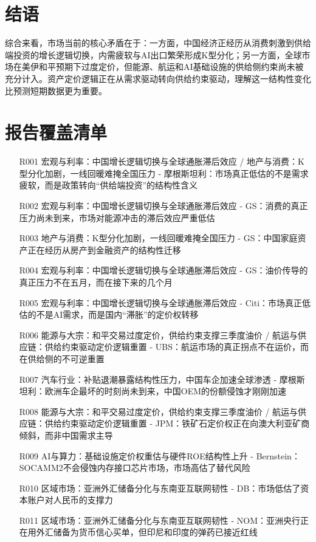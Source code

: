 \documentclass[11pt]{ctexart}
\begin{document}
\section{结语}
综合来看，市场当前的核心矛盾在于：一方面，中国经济正经历从消费刺激到供给端投资的增长逻辑切换，内需疲软与AI出口繁荣形成K型分化；另一方面，全球市场在美伊和平预期下过度定价，但能源、航运和AI基础设施的供给侧约束尚未被充分计入。资产定价逻辑正在从需求驱动转向供给约束驱动，理解这一结构性变化比预测短期数据更为重要。
\newpage
\section{报告覆盖清单}
\begin{itemize}
  \item [R001] 宏观与利率：中国增长逻辑切换与全球通胀滞后效应 / 地产与消费：K型分化加剧，一线回暖难掩全国压力 - 摩根斯坦利：市场真正低估的不是需求疲软，而是政策转向“供给端投资”的结构性含义
  \item [R002] 宏观与利率：中国增长逻辑切换与全球通胀滞后效应 - GS：消费的真正压力尚未到来，市场对能源冲击的滞后效应严重低估
  \item [R003] 地产与消费：K型分化加剧，一线回暖难掩全国压力 - GS：中国家庭资产正在经历从房产到金融资产的结构性迁移
  \item [R004] 宏观与利率：中国增长逻辑切换与全球通胀滞后效应 - GS：油价传导的真正压力不在五月，而在接下来的几个月
  \item [R005] 宏观与利率：中国增长逻辑切换与全球通胀滞后效应 - Citi：市场真正低估的不是AI需求，而是国内“滞胀”的定价权转移
  \item [R006] 能源与大宗：和平交易过度定价，供给约束支撑三季度油价 / 航运与供应链：供给约束驱动定价逻辑重置 - UBS：航运市场的真正拐点不在运价，而在供给侧的不可逆重置
  \item [R007] 汽车行业：补贴退潮暴露结构性压力，中国车企加速全球渗透 - 摩根斯坦利：欧洲车企最坏的时刻尚未到来，中国OEM的份额侵蚀才刚刚加速
  \item [R008] 能源与大宗：和平交易过度定价，供给约束支撑三季度油价 / 航运与供应链：供给约束驱动定价逻辑重置 - JPM：铁矿石定价权正在向澳大利亚矿商倾斜，而非中国需求主导
  \item [R009] AI与算力：基础设施定价权重估与硬件ROE结构性上升 - Bernstein：SOCAMM2不会侵蚀内存接口芯片市场，市场高估了替代风险
  \item [R010] 区域市场：亚洲外汇储备分化与东南亚互联网韧性 - DB：市场低估了资本账户对人民币的支撑力
  \item [R011] 区域市场：亚洲外汇储备分化与东南亚互联网韧性 - NOM：亚洲央行正在用外汇储备为货币信心买单，但印尼和印度的弹药已接近红线

\end{itemize}
\end{document}

